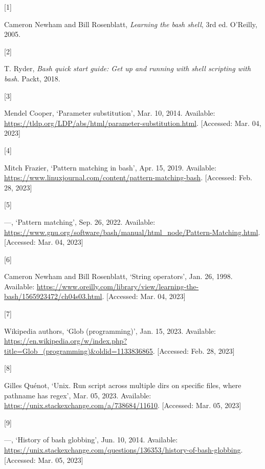 \documentclass[
  a4paper,
]{article}
\newlength{\cslhangindent}
\newlength{\csllabelwidth}
\newlength{\cslentryspacingunit} %
\newenvironment{CSLReferences}[2] %
 {%
  \setlength{\parindent}{0pt}
  \ifodd #1
  \let\oldpar\par
  \def\par{\hangindent=\cslhangindent\oldpar}
  \fi
  \setlength{\parskip}{#2\cslentryspacingunit}
 }%
 {}
\newcommand{\CSLLeftMargin}[1]{\parbox[t]{\csllabelwidth}{#1}}
\newcommand{\CSLRightInline}[1]{\parbox[t]{\linewidth - \csllabelwidth}{#1}\break}
\begin{document}
\hypertarget{refs}{}
\begin{CSLReferences}{0}{0}
\leavevmode{}%
\CSLLeftMargin{{[}1{]} }%
\CSLRightInline{Cameron Newham and Bill Rosenblatt, \emph{Learning the
bash shell}, 3rd ed. O'Reilly, 2005.}

\leavevmode{}%
\CSLLeftMargin{{[}2{]} }%
\CSLRightInline{T. Ryder, \emph{Bash quick start guide: Get up and
running with shell scripting with bash}. Packt, 2018.}

\leavevmode{}%
\CSLLeftMargin{{[}3{]} }%
\CSLRightInline{Mendel Cooper, {`Parameter substitution'}, Mar. 10,
2014. Available:
\url{https://tldp.org/LDP/abs/html/parameter-substitution.html}.
{[}Accessed: Mar. 04, 2023{]}}

\leavevmode{}%
\CSLLeftMargin{{[}4{]} }%
\CSLRightInline{Mitch Frazier, {`Pattern matching in bash'}, Apr. 15,
2019. Available:
\url{https://www.linuxjournal.com/content/pattern-matching-bash}.
{[}Accessed: Feb. 28, 2023{]}}

\leavevmode{}%
\CSLLeftMargin{{[}5{]} }%
\CSLRightInline{---, {`Pattern matching'}, Sep. 26, 2022. Available:
\url{https://www.gnu.org/software/bash/manual/html_node/Pattern-Matching.html}.
{[}Accessed: Mar. 04, 2023{]}}

\leavevmode{}%
\CSLLeftMargin{{[}6{]} }%
\CSLRightInline{Cameron Newham and Bill Rosenblatt, {`String
operators'}, Jan. 26, 1998. Available:
\url{https://www.oreilly.com/library/view/learning-the-bash/1565923472/ch04s03.html}.
{[}Accessed: Mar. 04, 2023{]}}

\leavevmode{}%
\CSLLeftMargin{{[}7{]} }%
\CSLRightInline{Wikipedia authors, {`Glob (programming)'}, Jan. 15,
2023. Available:
\url{https://en.wikipedia.org/w/index.php?title=Glob_(programming)\&oldid=1133836865}.
{[}Accessed: Feb. 28, 2023{]}}

\leavevmode{}%
\CSLLeftMargin{{[}8{]} }%
\CSLRightInline{Gilles Quénot, {`Unix. Run script across multiple dirs
on specific files, where pathname has regex'}, Mar. 05, 2023. Available:
\url{https://unix.stackexchange.com/a/738684/11610}. {[}Accessed: Mar.
05, 2023{]}}

\leavevmode{}%
\CSLLeftMargin{{[}9{]} }%
\CSLRightInline{---, {`History of bash globbing'}, Jun. 10, 2014.
Available:
\url{https://unix.stackexchange.com/questions/136353/history-of-bash-globbing}.
{[}Accessed: Mar. 05, 2023{]}}


\end{CSLReferences}
\end{document}
